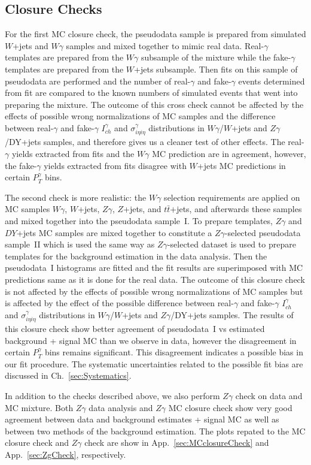 \subsection{Closure Checks}
\label{sec:AN_BackSubtr_Closure}

For the first MC closure check, the pseudodata sample is prepared from simulated $W$+jets and $W\gamma$ samples and mixed together to mimic real data. Real-$\gamma$ templates are prepared from the $W\gamma$ subsample of the mixture while the fake-$\gamma$ templates are prepared from the $W$+jets subsample. Then fits on this sample of pseudodata are performed and the number of real-$\gamma$ and fake-$\gamma$ events determined from fit are compared to the known numbers of simulated events that went into preparing the mixture. The outcome of this cross check cannot be affected by  the effects of possible wrong normalizations of MC samples and the difference between real-$\gamma$ and fake-$\gamma$ $I_{ch}^{\gamma}$ and $\sigma_{i\eta i\eta}^{\gamma}$ distributions in $W\gamma$/$W$+jets and $Z\gamma$/DY+jets samples, and therefore gives us a cleaner test of other effects. The real-$\gamma$ yields extracted from fits and the $W\gamma$ MC prediction are in agreement, however, the fake-$\gamma$ yields extracted from fits disagree with $W$+jets MC predictions in certain $P_T^{\gamma}$ bins.

The second check is more realistic: the $W\gamma$ selection requirements are applied on MC samples $W\gamma$, $W$+jets, $Z\gamma$, $Z$+jets, and $t\bar{t}$+jets, and afterwards these samples and mixed together into the pseudodata sample~I. To prepare templates, $Z\gamma$ and $DY$+jets MC samples are mixed together to constitute a $Z\gamma$-selected pseudodata sample~II which is used the same way as $Z\gamma$-selected dataset is used to prepare templates for the background estimation in the data analysis. Then the pseudodata~I histograms are fitted and the fit results are superimposed with MC predictions same as it is done for the real data. The outcome of this closure check is not affected by the effects of possible wrong normalizations of MC samples but is affected by the effect of the possible difference between real-$\gamma$ and fake-$\gamma$ $I_{ch}^{\gamma}$ and $\sigma_{i\eta i\eta}^{\gamma}$ distributions in $W\gamma$/$W$+jets and $Z\gamma$/DY+jets samples. The results of this closure check show better agreement of pseudodata~I vs estimated background + signal MC than we observe in data, however the disagreement in certain $P_T^{\gamma}$ bins remains significant. This disagreement indicates a possible bias in our fit procedure. The systematic uncertainties related to the possible fit bias are discussed in Ch.~\ref{sec:Systematics}.

In addition to the checks described above, we also perform $Z\gamma$ check on data and MC mixture. Both $Z\gamma$ data analysis and $Z\gamma$ MC closure check show very good agreement between data and background estimates + signal MC as well as between two methods of the background estimation. The plots repated to the MC closure check and $Z\gamma$ check are show in App.~\ref{sec:MCclosureCheck} and App.~\ref{sec:ZgCheck}, respectively.

